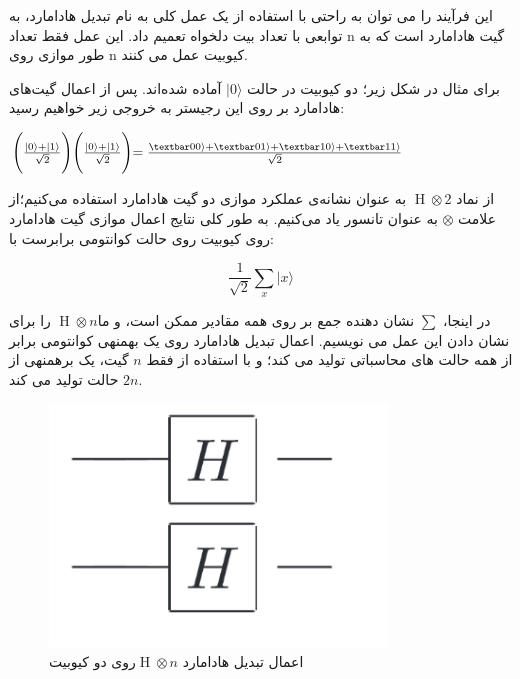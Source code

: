 \documentclass{book}
\begin{document}
این فرآیند را می توان به راحتی  با استفاده از یک عمل کلی به نام تبدیل هادامارد، به توابعی با تعداد بیت دلخواه تعمیم داد. این عمل فقط تعداد n گیت هادامارد است که به طور موازی روی n کیوبیت عمل می کنند.

برای مثال در شکل زیر؛ دو کیوبیت در حالت $\vert 0 \rangle$ آماده شده‌‌اند. پس از اعمال گیت‌های هادامارد بر روی این رجیستر به خروجی زیر خواهیم رسید: 

\begin{center}
	$ \Biggl( \frac{\vert 0 \rangle + \vert 1 \rangle}{\sqrt{2}}\Biggl)\Biggl( \frac{\vert 0 \rangle + \vert 1 \rangle}{\sqrt{2}}\Biggl) = \frac{\textbar00\rangle + \textbar01\rangle + \textbar10\rangle + \textbar11\rangle}{\sqrt{2}}$

\end{center}

از نماد $\operatorname{H} \otimes 2$ به عنوان نشانه‌ی عملکرد موازی دو گیت هادامارد استفاده می‌کنیم؛از علامت $\otimes$ به عنوان تانسور یاد می‌کنیم. به طور کلی نتایج اعمال موازی گیت هادامارد روی  کیوبیت روی حالت کوانتومی برابرست با:

\begin{center}
	\[\frac{1}{\sqrt{2}} \sum_{x} \vert x \rangle\]
\end{center}


در اینجا، $\sum$ نشان دهنده جمع بر روی همه مقادیر ممکن  است، و ما$\operatorname{H} \otimes n$  را برای نشان دادن این عمل می نویسیم.
اعمال تبدیل هادامارد روی یک بهمنهی کوانتومی برابر از همه حالت های محاسباتی تولید می کند؛ و با استفاده از فقط $n$ گیت، یک برهمنهی از $2n$ حالت تولید می کند.
\begin{center}
	\begin{figure}[ht]
		\centering
		\includegraphics[width=0.8\textwidth]{Multyhadamard.png}
		\caption{اعمال تبدیل هادامارد $\operatorname{H} \otimes n$روی دو کیوبیت}
	\end{figure}
\end{center}
\end{document}
